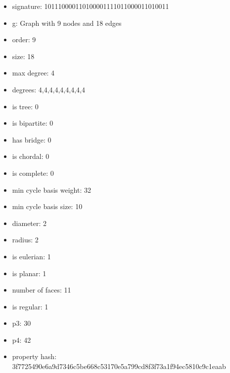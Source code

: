 \newpage
\begin{figure}
\end{figure}
\begin{itemize}
\item signature: 101110000110100001111011000011010011
\item g: Graph with 9 nodes and 18 edges
\item order: 9
\item size: 18
\item max degree: 4
\item degrees: 4,4,4,4,4,4,4,4,4
\item is tree: 0
\item is bipartite: 0
\item has bridge: 0
\item is chordal: 0
\item is complete: 0
\item min cycle basis weight: 32
\item min cycle basis size: 10
\item diameter: 2
\item radius: 2
\item is eulerian: 1
\item is planar: 1
\item number of faces: 11
\item is regular: 1
\item p3: 30
\item p4: 42
\item property hash: 3f7725490e6a9d7346c5be668c53170e5a799cd8f3f73a1f94ec5810c9c1eaab
\end{itemize}
